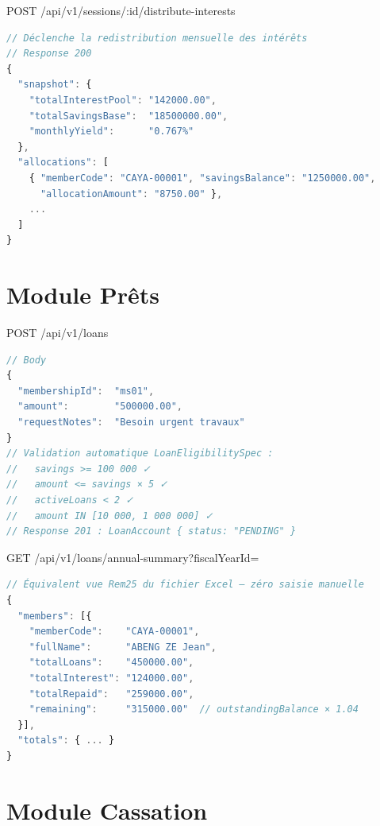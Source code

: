 \documentclass[12pt, a4paper]{report}
\begin{document}
\begin{apiBox}{POST /api/v1/sessions/:id/distribute-interests \quad [TRESORIER]}
\begin{lstlisting}[language=TypeScript, numbers=none]
// Déclenche la redistribution mensuelle des intérêts
// Response 200
{
  "snapshot": {
    "totalInterestPool": "142000.00",
    "totalSavingsBase":  "18500000.00",
    "monthlyYield":      "0.767%"
  },
  "allocations": [
    { "memberCode": "CAYA-00001", "savingsBalance": "1250000.00",
      "allocationAmount": "8750.00" },
    ...
  ]
}
\end{lstlisting}
\end{apiBox}

\section{Module Prêts}

\begin{apiBox}{POST /api/v1/loans }
\begin{lstlisting}[language=TypeScript, numbers=none]
// Body
{
  "membershipId":  "ms01",
  "amount":        "500000.00",
  "requestNotes":  "Besoin urgent travaux"
}
// Validation automatique LoanEligibilitySpec :
//   savings >= 100 000 ✓
//   amount <= savings × 5 ✓
//   activeLoans < 2 ✓
//   amount IN [10 000, 1 000 000] ✓
// Response 201 : LoanAccount { status: "PENDING" }
\end{lstlisting}
\end{apiBox}

\begin{apiBox}{GET /api/v1/loans/annual-summary?fiscalYearId= \quad [BUREAU]}
\begin{lstlisting}[language=TypeScript, numbers=none]
// Équivalent vue Rem25 du fichier Excel — zéro saisie manuelle
{
  "members": [{
    "memberCode":    "CAYA-00001",
    "fullName":      "ABENG ZE Jean",
    "totalLoans":    "450000.00",
    "totalInterest": "124000.00",
    "totalRepaid":   "259000.00",
    "remaining":     "315000.00"  // outstandingBalance × 1.04
  }],
  "totals": { ... }
}
\end{lstlisting}
\end{apiBox}

\section{Module Cassation}
\end{document}
